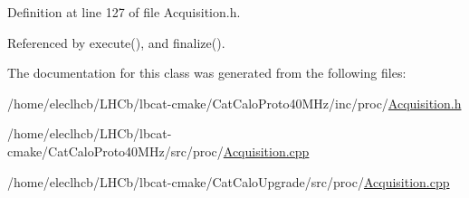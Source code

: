 Definition at line 127 of file Acquisition.h.

Referenced by execute(), and finalize().

The documentation for this class was generated from the following files:\begin{DoxyCompactItemize}
\item 
/home/eleclhcb/LHCb/lbcat-\/cmake/CatCaloProto40MHz/inc/proc/\hyperlink{CatCaloProto40MHz_2inc_2proc_2Acquisition_8h}{Acquisition.h}\item 
/home/eleclhcb/LHCb/lbcat-\/cmake/CatCaloProto40MHz/src/proc/\hyperlink{CatCaloProto40MHz_2src_2proc_2Acquisition_8cpp}{Acquisition.cpp}\item 
/home/eleclhcb/LHCb/lbcat-\/cmake/CatCaloUpgrade/src/proc/\hyperlink{CatCaloUpgrade_2src_2proc_2Acquisition_8cpp}{Acquisition.cpp}\end{DoxyCompactItemize}
